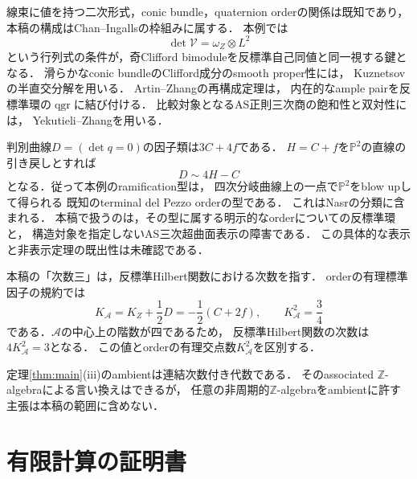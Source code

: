 \documentclass[11pt,a4paper]{ltjsarticle}
\theoremstyle{definition}
\begin{document}
線束に値を持つ二次形式，conic bundle，quaternion orderの関係は既知であり，
本稿の構成はChan--Ingalls\cite[Sections~2--3, 5--6]{ChanIngalls2012}の枠組みに属する．
本例では
\[
 \det\mathcal V=\omega_Z\otimes L^2
\]
という行列式の条件が，奇Clifford bimoduleを反標準自己同値と同一視する鍵となる．
滑らかなconic bundleのClifford成分のsmooth proper性には，
Kuznetsovの半直交分解\cite[Theorem~4.2]{KuznetsovQuadric}を用いる．
Artin--Zhangの再構成定理\cite[Theorem~4.5]{AZ1994}は，
内在的なample pairを反標準環の$\operatorname{qgr}$に結び付ける．
比較対象となるAS正則三次商の飽和性と双対性には，
Yekutieli--Zhang\cite[Theorem~4.2, Corollary~4.3]{YZ1997}を用いる．

判別曲線$D=(\det q=0)$の因子類は$3C+4f$である．
$H=C+f$を$\mathbb P^2$の直線の引き戻しとすれば
\[
 D\sim 4H-C
\]
となる．従って本例のramification型は，
四次分岐曲線上の一点で$\mathbb P^2$をblow upして得られる
既知のterminal del Pezzo orderの型である．
これはNasrの分類\cite[arXiv版，Theorems~1.1(2), 2.16]{Nasr2020}に含まれる．
本稿で扱うのは，その型に属する明示的なorderについての反標準環と，
構造対象を指定しないAS三次超曲面表示の障害である．
この具体的な表示と非表示定理の既出性は未確認である．

本稿の「次数三」は，反標準Hilbert関数における次数を指す．
orderの有理標準因子の規約\cite[arXiv版，Definition~2.1]{Nasr2020}では
\begin{equation}
 K_{\mathcal A}=K_Z+\frac12D=-\frac12(C+2f),\qquad
 K_{\mathcal A}^2=\frac34
 \label{eq:canonical-order-degree}
\end{equation}
である．$\mathcal A$の中心上の階数が四であるため，
反標準Hilbert関数の次数は$4K_{\mathcal A}^2=3$となる．
この値とorderの有理交点数$K_{\mathcal A}^2$を区別する．

定理\ref{thm:main}(iii)のambientは連結次数付き代数である．
そのassociated $\mathbb Z$-algebraによる言い換えはできるが，
任意の非周期的$\mathbb Z$-algebraをambientに許す主張は本稿の範囲に含めない．





\section{有限計算の証明書}
\label{sec:reproducibility}
\end{document}
